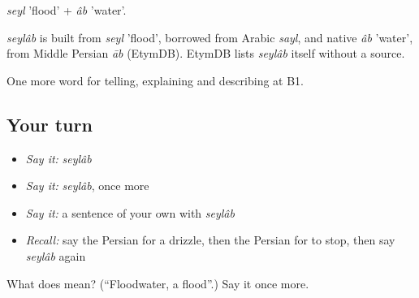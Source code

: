 \emph{seyl} 'flood' + \emph{âb} 'water'.

\begin{cousinweb}
\emph{seylâb} is built from \emph{seyl} 'flood', borrowed from Arabic \emph{sayl}, and native \emph{âb} 'water', from Middle Persian \emph{āb} (EtymDB). EtymDB lists \emph{seylâb} itself without a source.
\end{cousinweb}

\begin{grammarlens}[title={What you've built}]
One more word for telling, explaining and describing at B1.
\end{grammarlens}

\subsection*{Your turn}
\begin{itemize}
\raggedright
  \item \emph{Say it:} \emph{seylâb}
  \item \emph{Say it:} \emph{seylâb}, once more
  \item \emph{Say it:} a sentence of your own with \emph{seylâb}
  \item \emph{Recall:} say the Persian for a drizzle, then the Persian for to stop, then say \emph{seylâb} again
\end{itemize}

\begin{tcolorbox}[breakable,colback=teal!4,colframe=teal!35!black,title={Before you move on}]
What does  mean? (\textquotedblleft{}Floodwater, a flood\textquotedblright{}.) Say it once more.
\end{tcolorbox}
